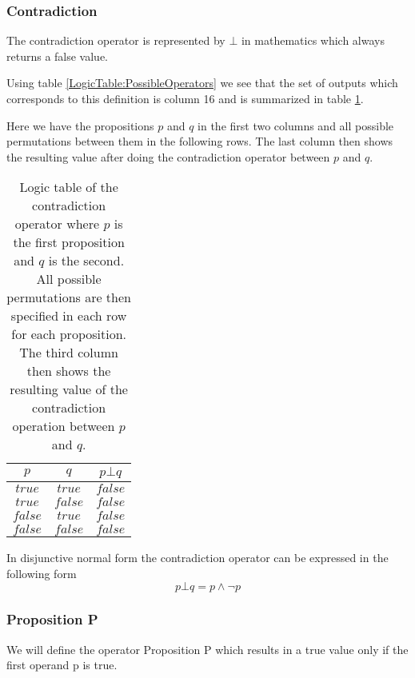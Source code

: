     \subsubsection{Contradiction}
        The contradiction operator is represented by $\bot$ in mathematics which always returns a false value.
        
        Using table \ref{LogicTable:PossibleOperators} we see that the set of outputs which corresponds to this definition is column 16 and is summarized in table \ref{LogicTable:contradiction}.
        
        Here we have the propositions $p$ and $q$ in the first two columns and all possible permutations between them in the following rows. The last column then shows the resulting value after doing the contradiction operator between $p$ and $q$.
        
        \begin{table}[h!]
            \centering
            \begin{tabular}{|c|c|c|}
            	\hline
            	  $p$   &   $q$   & $p \bot q$ \\ \hline
            	$true$  & $true$  &  $false$   \\ \hline
            	$true$  & $false$ &  $false$   \\ \hline
            	$false$ & $true$  &  $false$   \\ \hline
            	$false$ & $false$ &  $false$   \\ \hline
            \end{tabular}
            \caption{Logic table of the contradiction operator where $p$ is the first proposition and $q$ is the second. All possible permutations are then specified in each row for each proposition. The third column then shows the resulting value of the contradiction operation between $p$ and $q$.}
            \label{LogicTable:contradiction}
        \end{table}
        
        In disjunctive normal form the contradiction operator can be expressed in the following form
        \begin{equation}
            p \bot q = p \wedge \neg p
        \end{equation}
    
    \subsubsection{Proposition P}
        We will define the operator Proposition P which results in a true value only if the first operand p is true.
        
